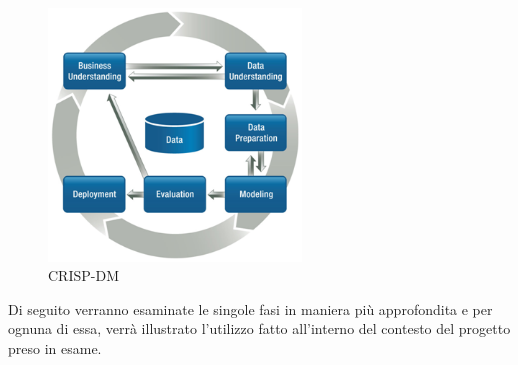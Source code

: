 \begin{figure}[hbtp]
\centering
\includegraphics[width=0.6\textwidth]{./images/CRISPDM.png}
\caption{CRISP-DM}
\label{CRISPDM}
\end{figure}

Di seguito verranno esaminate le singole fasi in maniera più approfondita e per ognuna di essa, verrà illustrato l'utilizzo fatto all'interno del contesto del progetto preso in esame.